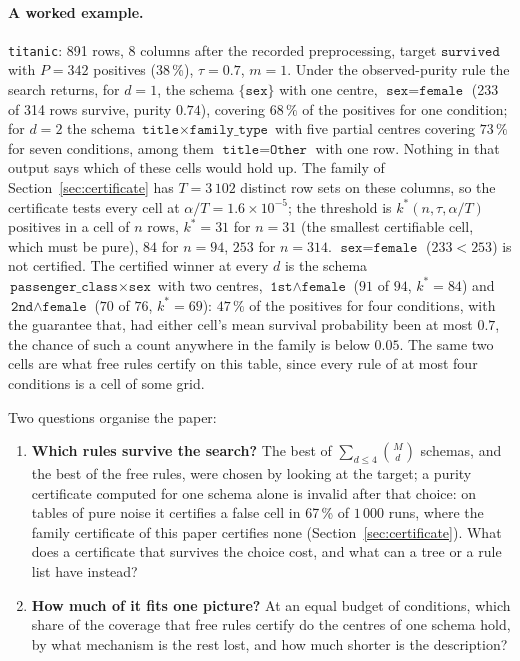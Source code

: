 \documentclass[11pt]{article}
\begin{document}
\paragraph{A worked example.}\label{sec:intro-example} \texttt{titanic}: 891 rows, 8 columns after the recorded preprocessing, target $\texttt{survived}$ with $P=342$ positives (38\,\%), $\tau=0.7$, $m=1$. Under the observed-purity rule the search returns, for $d=1$, the schema $\{\texttt{sex}\}$ with one centre, $\texttt{sex}=\texttt{female}$ (233 of 314 rows survive, purity $0.74$), covering $68\,\%$ of the positives for one condition; for $d=2$ the schema $\texttt{title}\times\texttt{family\_type}$ with five partial centres covering $73\,\%$ for seven conditions, among them $\texttt{title}=\texttt{Other}$ with one row. Nothing in that output says which of these cells would hold up. The family of Section~\ref{sec:certificate} has $T=3\,102$ distinct row sets on these columns, so the certificate tests every cell at $\alpha/T=1.6\times10^{-5}$; the threshold is $k^*(n,\tau,\alpha/T)$ positives in a cell of $n$ rows, $k^*=31$ for $n=31$ (the smallest certifiable cell, which must be pure), $84$ for $n=94$, $253$ for $n=314$. $\texttt{sex}=\texttt{female}$ ($233<253$) is not certified. The certified winner at every $d$ is the schema $\texttt{passenger\_class}\times\texttt{sex}$ with two centres, $\texttt{1st}\wedge\texttt{female}$ ($91$ of $94$, $k^*=84$) and $\texttt{2nd}\wedge\texttt{female}$ ($70$ of $76$, $k^*=69$): $47\,\%$ of the positives for four conditions, with the guarantee that, had either cell's mean survival probability been at most $0.7$, the chance of such a count anywhere in the family is below $0.05$. The same two cells are what free rules certify on this table, since every rule of at most four conditions is a cell of some grid.

Two questions organise the paper:

\begin{enumerate}
\item \textbf{Which rules survive the search?} The best of $\sum_{d\le 4}\binom{M}{d}$ schemas, and the best of the free rules, were chosen by looking at the target; a purity certificate computed for one schema alone is invalid after that choice: on tables of pure noise it certifies a false cell in 67\,\% of $1\,000$ runs, where the family certificate of this paper certifies none (Section~\ref{sec:certificate}). What does a certificate that survives the choice cost, and what can a tree or a rule list have instead?
\item \textbf{How much of it fits one picture?} At an equal budget of conditions, which share of the coverage that free rules certify do the centres of one schema hold, by what mechanism is the rest lost, and how much shorter is the description?
\end{enumerate}
\end{document}
